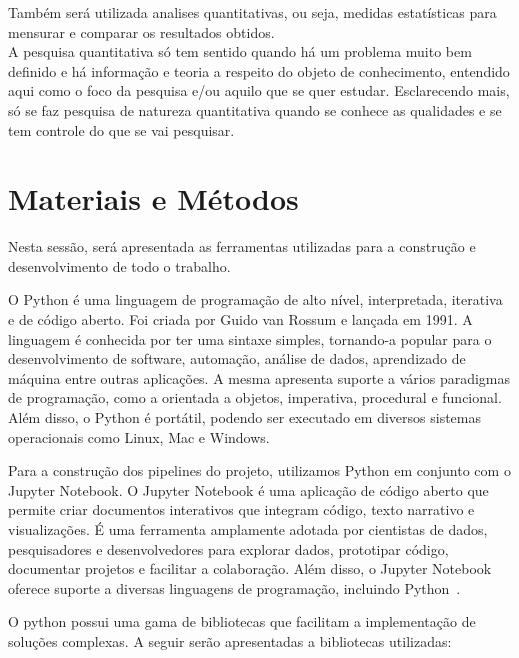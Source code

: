 Também será utilizada analises quantitativas, ou seja, medidas estatísticas para mensurar e comparar os resultados obtidos.\\
A pesquisa quantitativa só tem sentido quando há um problema muito bem definido e há informação e teoria a respeito do objeto de conhecimento, entendido aqui como o foco da pesquisa e/ou aquilo que se quer estudar. Esclarecendo mais, só se faz pesquisa de natureza quantitativa quando se conhece as qualidades e se tem controle do que se vai pesquisar.~\cite{da_silva_pesquisa_2014}

\section{Materiais e Métodos}
Nesta sessão, será apresentada as ferramentas utilizadas para a construção e desenvolvimento de todo o trabalho.

O Python é uma linguagem de programação de alto nível, interpretada, iterativa e de código aberto. Foi criada por Guido van Rossum e lançada em 1991. A linguagem é conhecida por ter uma sintaxe simples, tornando-a popular para o desenvolvimento de software, automação, análise de dados, aprendizado de máquina entre outras aplicações. A mesma apresenta suporte a vários paradigmas de programação, como a orientada a objetos, imperativa, procedural e funcional. Além disso, o Python é portátil, podendo ser executado em diversos sistemas operacionais como Linux, Mac e Windows.~\cite{python-reference}

Para a construção dos pipelines do projeto, utilizamos Python em conjunto com o Jupyter Notebook. O Jupyter Notebook é uma aplicação de código aberto que permite criar documentos interativos que integram código, texto narrativo e visualizações. É uma ferramenta amplamente adotada por cientistas de dados, pesquisadores e desenvolvedores para explorar dados, prototipar código, documentar projetos e facilitar a colaboração. Além disso, o Jupyter Notebook oferece suporte a diversas linguagens de programação, incluindo Python~\cite{jupyter-notebook}.

O python possui uma gama de bibliotecas que facilitam a implementação de soluções complexas. A seguir serão apresentadas a bibliotecas utilizadas:

